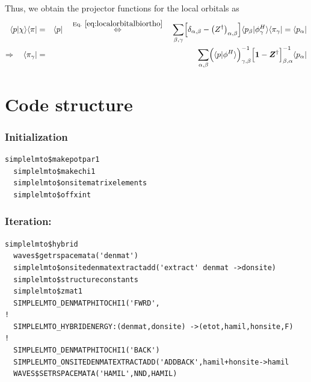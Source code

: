 \documentclass[11pt,a4paper]{report}
\begin{document}
Thus, we obtain the projector functions for the local orbitals as
\begin{eqnarray}
\langle{p}|\chi\rangle\langle\pi|&=&\langle{p}|
%
%
\quad\eqrel{eq:localorbitalbiortho}{\Leftrightarrow}\quad
\sum_{\beta,\gamma}
\Bigl[\delta_{\alpha,\beta}-\left(Z^\dagger\right)_{\alpha,\beta}\Bigr]
\langle{p}_\beta|\phi^H_\gamma\rangle
\langle\pi_\gamma|
=\langle{p}_\alpha|
\nonumber\\
%
\Rightarrow\quad\langle\pi_{\gamma}|&=&
\sum_{\alpha,\beta}
\Bigl(\langle{p}|\phi^H\rangle\Bigr)^{-1}_{\gamma,\beta}
\Bigl[\mat{1}-\mat{Z}^\dagger\Bigr]^{-1}_{\beta,\alpha}  
\langle{p}_\alpha|
\label{eq:chiprojectofintermsofphiprojector}
\end{eqnarray}


\section{Code structure}

\subsubsection{Initialization}
\begin{verbatim}
simplelmto$makepotpar1
  simplelmto$makechi1
  simplelmto$onsitematrixelements
  simplelmto$offxint
\end{verbatim}

\subsubsection{Iteration:}
\begin{verbatim}
simplelmto$hybrid
  waves$getrspacemata('denmat')
  simplelmto$onsitedenmatextractadd('extract' denmat ->donsite)
  simplelmto$structureconstants
  simplelmto$zmat1
  SIMPLELMTO_DENMATPHITOCHI1('FWRD',
!
  SIMPLELMTO_HYBRIDENERGY:(denmat,donsite) ->(etot,hamil,honsite,F)
!
  SIMPLELMTO_DENMATPHITOCHI1('BACK')
  SIMPLELMTO_ONSITEDENMATEXTRACTADD('ADDBACK',hamil+honsite->hamil
  WAVES$SETRSPACEMATA('HAMIL',NND,HAMIL)
\end{verbatim}
\end{document}
